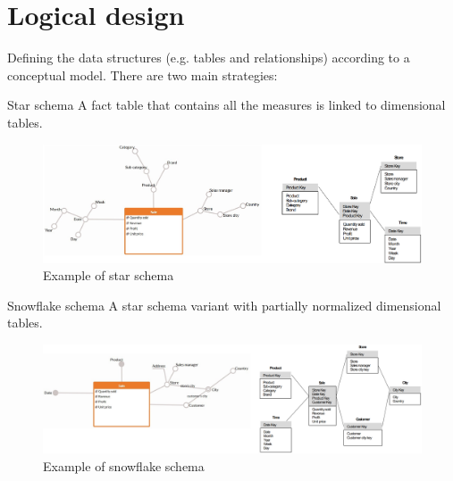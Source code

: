 \section{Logical design}
Defining the data structures (e.g. tables and relationships) according to a conceptual model.
There are two main strategies:
\begin{descriptionlist}
    \item[Star schema] 
        A fact table that contains all the measures is linked to dimensional tables.
        \begin{figure}[H]
            \centering
            \includegraphics[width=\textwidth]{img/logical_star_schema.png}
            \caption{Example of star schema}
        \end{figure}

    \item[Snowflake schema] 
        A star schema variant with partially normalized dimensional tables.
        \begin{figure}[H]
            \centering
            \includegraphics[width=\textwidth]{img/logical_snowflake_schema.png}
            \caption{Example of snowflake schema}
        \end{figure}
\end{descriptionlist}